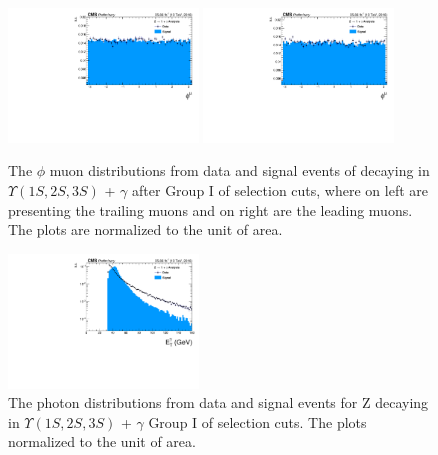 \begin{figure}[!htbp]
\begin{center}
\includegraphics[width=0.45\textwidth]{figures_and_tables/outputPlots/ZtoUpsilon_Cat0_ZZZZZ/au/data_x_mc/noKinCuts/h_noKin_TrailingMu_phi}\hspace*{1.cm}
\includegraphics[width=0.45\textwidth]{figures_and_tables/outputPlots/ZtoUpsilon_Cat0_ZZZZZ/au/data_x_mc/noKinCuts/h_noKin_LeadingMu_phi}
\end{center}\vspace*{-.5cm}
\caption{The $\phi$ muon distributions from data and signal events of \Z decaying in $\Upsilon(1S,2S,3S)$ + $\gamma$ after Group I of selection cuts, where on left are presenting the trailing muons and on right are the leading muons. The plots are normalized to the unit of area.}
\label{fig:phiMuons_ZtoUpsilon_Cat0}
\end{figure}


\begin{figure}[!htbp]
\begin{center}
\includegraphics[width=0.45\textwidth]{figures_and_tables/outputPlots/ZtoUpsilon_Cat0_ZZZZZ/au/data_x_mc/noKinCuts/h_noKin_Photon_pt}\hspace*{1.cm}
\end{center}\vspace*{-.5cm}
\caption{The \PT photon distributions from data and signal events for Z decaying in $\Upsilon(1S,2S,3S)$ + $\gamma$ Group I of selection cuts. The plots normalized to the unit of area.}
\label{fig:pTPhoton_ZtoUpsilon_Cat0}
\end{figure}


